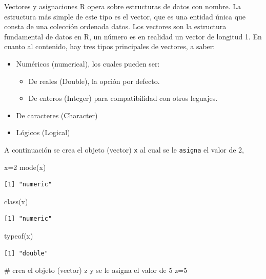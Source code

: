 \documentclass[
  ignorenonframetext,
  aspectratio=169,
  spanish,
]{beamer}
\newenvironment{Shaded}{\begin{snugshade}}{\end{snugshade}}
\newcommand{\CommentTok}[1]{\textcolor[rgb]{0.37,0.37,0.37}{#1}}
\newcommand{\DecValTok}[1]{\textcolor[rgb]{0.68,0.00,0.00}{#1}}
\newcommand{\FunctionTok}[1]{\textcolor[rgb]{0.28,0.35,0.67}{#1}}
\newcommand{\NormalTok}[1]{\textcolor[rgb]{0.00,0.23,0.31}{#1}}
\newcommand{\OtherTok}[1]{\textcolor[rgb]{0.00,0.23,0.31}{#1}}
\providecommand{\tightlist}{%
  \setlength{\itemsep}{0pt}\setlength{\parskip}{0pt}}
\begin{document}
\begin{frame}[fragile]{Vectores y asignaciones}
\label{vectores-y-asignaciones}
R opera sobre estructuras de datos con nombre. La estructura más simple
de este tipo es el vector, que es una entidad única que consta de una
colección ordenada datos. Los vectores son la estructura fundamental de
datos en R, un número es en realidad un vector de longitud 1. En cuanto
al contenido, hay tres tipos principales de vectores, a saber:

\begin{itemize}
\tightlist
\item
  Numéricos (numerical), los cuales pueden ser:

  \begin{itemize}
  \tightlist
  \item
    De reales (Double), la opción por defecto.
  \item
    De enteros (Integer) para compatibilidad con otros leguajes.
  \end{itemize}
\item
  De caracteres (Character)
\item
  Lógicos (Logical)
\end{itemize}

A continuación se crea el objeto (vector) \texttt{x} al cual se le
\texttt{asigna} el valor de 2,

\begin{Shaded}
\begin{Highlighting}[]
\NormalTok{x}\OtherTok{=}\DecValTok{2}
\FunctionTok{mode}\NormalTok{(x)}
\end{Highlighting}
\end{Shaded}

\begin{verbatim}
[1] "numeric"
\end{verbatim}

\begin{Shaded}
\begin{Highlighting}[]
\FunctionTok{class}\NormalTok{(x)}
\end{Highlighting}
\end{Shaded}

\begin{verbatim}
[1] "numeric"
\end{verbatim}

\begin{Shaded}
\begin{Highlighting}[]
\FunctionTok{typeof}\NormalTok{(x)}
\end{Highlighting}
\end{Shaded}

\begin{verbatim}
[1] "double"
\end{verbatim}

\begin{Shaded}
\begin{Highlighting}[]
\CommentTok{\# crea el objeto (vector) z  y se le asigna el valor de 5}
\NormalTok{z}\OtherTok{=}\DecValTok{5}
\end{Highlighting}
\end{Shaded}
\end{frame}
\end{document}
